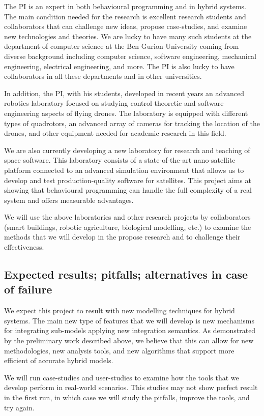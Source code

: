 \documentclass[11pt]{article}
\begin{document}
The PI is an expert in both behavioural programming and in hybrid systems. The main condition needed for the research is excellent research students and collaborators that can challenge new ideas, propose case-studies, and examine new technologies and theories. We are lucky to have many such students at the department of computer science at the Ben Gurion University coming from diverse background including computer science, software engineering, mechanical engineering, electrical engineering, and more. The PI is also lucky to have collaborators in all these departments and in other universities. 

In addition, the PI, with his students, developed in recent years an advanced robotics laboratory focused on studying control theoretic and software engineering aspects of flying drones. The laboratory is equipped with different types of quadrotors, an advanced array of cameras for tracking the location of the drones, and other equipment needed for academic research in this field.

We are also currently developing a new laboratory for research and teaching of space software. This laboratory consists of a state-of-the-art nano-satellite platform connected to an advanced simulation environment that allows us to develop and test production-quality software for satellites. This project aims at showing that behavioural programming can handle the full complexity of a real system and offers measurable advantages.

We will use the above laboratories and other research projects by collaborators (smart buildings, robotic agriculture, biological modelling, etc.) to examine the methods that we will develop in the propose research and to challenge their effectiveness. 

\subsection{Expected results; pitfalls; alternatives in case of failure}
	
We expect this project to result with new modelling techniques for hybrid systems. The main new type of features that we will develop is new mechanisms for integrating sub-models applying new integration semantics. As demonstrated by the preliminary work described above, we believe that this can allow for new methodologies, new analysis tools, and new algorithms that support more efficient of accurate hybrid models.

We will run case-studies and user-studies to examine how the tools that we develop perform in real-world scenarios. This studies may not show perfect result in the first run, in which case we will study the pitfalls, improve the tools, and try again.



\end{document}
